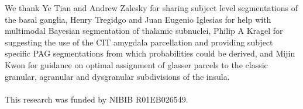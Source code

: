 \documentclass[10pt,letterpaper]{article}
\begin{document}
We thank Ye Tian and Andrew Zalesky for sharing subject level segmentations of the basal ganglia, Henry Tregidgo and Juan Eugenio Iglesias for help with multimodal Bayesian segmentation of thalamic subnuclei, Philip A Kragel for suggesting the use of the CIT amygdala parcellation and providing subject specific PAG segmentations from which probabilities could be derived, and Mijin Kwon for guidance on optimal assignment of glasser parcels to the classic granular, agranular and dysgranular subdivisions of the insula.
\\
\\
This research was funded by NIBIB R01EB026549.



\setlength{\bibleftmargin}{.125in}
\setlength{\bibindent}{-\bibleftmargin}


\end{document}
